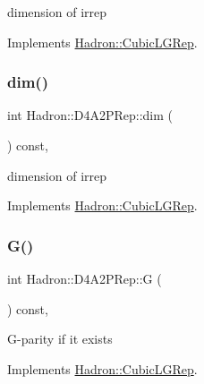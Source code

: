 dimension of irrep 

Implements \mbox{\hyperlink{structHadron_1_1CubicLGRep_a3acbaea26503ed64f20df693a48e4cdd}{Hadron\+::\+Cubic\+L\+G\+Rep}}.

\mbox{\label{structHadron_1_1D4A2PRep_ace9d2d2d6b73e3ec4de7682a8930ff1c}} 
\subsubsection{\texorpdfstring{dim()}{dim()}\hspace{0.1cm}{\footnotesize\ttfamily [3/3]}}
{\footnotesize\ttfamily int Hadron\+::\+D4\+A2\+P\+Rep\+::dim (\begin{DoxyParamCaption}{ }\end{DoxyParamCaption}) const\hspace{0.3cm}{\ttfamily [inline]}, {\ttfamily [virtual]}}

dimension of irrep 

Implements \mbox{\hyperlink{structHadron_1_1CubicLGRep_a3acbaea26503ed64f20df693a48e4cdd}{Hadron\+::\+Cubic\+L\+G\+Rep}}.

\mbox{\label{structHadron_1_1D4A2PRep_a9f96095822166d1ed6380bbeacb21938}} 
\subsubsection{\texorpdfstring{G()}{G()}\hspace{0.1cm}{\footnotesize\ttfamily [1/3]}}
{\footnotesize\ttfamily int Hadron\+::\+D4\+A2\+P\+Rep\+::G (\begin{DoxyParamCaption}{ }\end{DoxyParamCaption}) const\hspace{0.3cm}{\ttfamily [inline]}, {\ttfamily [virtual]}}

G-\/parity if it exists 

Implements \mbox{\hyperlink{structHadron_1_1CubicLGRep_ace26f7b2d55e3a668a14cb9026da5231}{Hadron\+::\+Cubic\+L\+G\+Rep}}.

\mbox{\label{structHadron_1_1D4A2PRep_a9f96095822166d1ed6380bbeacb21938}} 

